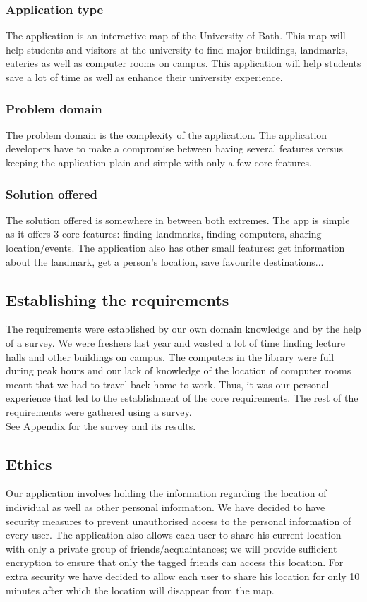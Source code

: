 \documentclass[10pt,a4paper,oneside]{report}
\begin{document}
\subsubsection*{Application type}
 The application is an interactive map of the University of Bath. This map will help students and visitors at the university to find major buildings, landmarks, eateries as well as computer rooms on campus. This application will help students save a lot of time as well as enhance their university experience.

\subsubsection*{Problem domain}
The problem domain is the complexity of the application. The application developers have to make a compromise between having several features versus keeping the application plain and simple with only a few core features.

\subsubsection*{Solution offered}
The solution offered is somewhere in between both extremes. The app is simple as it offers 3 core features: finding landmarks, finding computers, sharing location/events.
The application also has other small features: get information about the landmark, get a person’s location, save favourite destinations...
\subsection*{Establishing the requirements}
The requirements were established by our own domain knowledge and by the help of a survey.
We were freshers last year and wasted a lot of time finding lecture halls and other buildings on campus. The computers in the library were full during peak hours and our lack of knowledge of the location of computer rooms meant that we had to travel back home to work. Thus, it was our personal experience that led to the establishment of the core requirements. The rest of the requirements were gathered using a survey. \\

See Appendix for the survey and its results.
\clearpage

\subsection*{Ethics}
Our application involves holding the information regarding the location of individual as well as other personal information. We have decided to have security measures to prevent unauthorised access to the personal information of every user. The application also allows each user to share his current location with only a private group of friends/acquaintances; we will provide sufficient encryption to ensure that only the tagged friends can access this location. For extra security we have decided to allow each user to share his location for only 10 minutes after which the location will disappear from the map.
\end{document}
